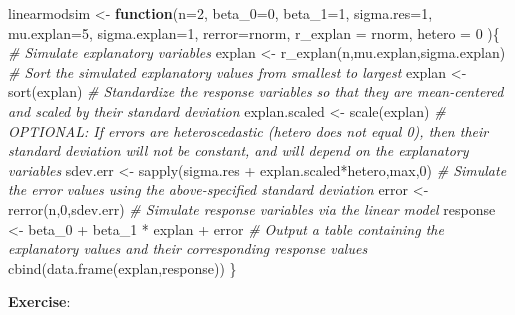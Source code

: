 \documentclass[
]{book}
\newenvironment{Shaded}{\begin{snugshade}}{\end{snugshade}}
\newcommand{\AttributeTok}[1]{\textcolor[rgb]{0.77,0.63,0.00}{#1}}
\newcommand{\CommentTok}[1]{\textcolor[rgb]{0.56,0.35,0.01}{\textit{#1}}}
\newcommand{\ControlFlowTok}[1]{\textcolor[rgb]{0.13,0.29,0.53}{\textbf{#1}}}
\newcommand{\DecValTok}[1]{\textcolor[rgb]{0.00,0.00,0.81}{#1}}
\newcommand{\FunctionTok}[1]{\textcolor[rgb]{0.00,0.00,0.00}{#1}}
\newcommand{\NormalTok}[1]{#1}
\newcommand{\OtherTok}[1]{\textcolor[rgb]{0.56,0.35,0.01}{#1}}
\newcommand{\SpecialCharTok}[1]{\textcolor[rgb]{0.00,0.00,0.00}{#1}}
\begin{document}
\begin{Shaded}
\begin{Highlighting}[]
\NormalTok{linearmodsim }\OtherTok{\textless{}{-}} \ControlFlowTok{function}\NormalTok{(}\AttributeTok{n=}\DecValTok{2}\NormalTok{, }\AttributeTok{beta\_0=}\DecValTok{0}\NormalTok{, }\AttributeTok{beta\_1=}\DecValTok{1}\NormalTok{, }\AttributeTok{sigma.res=}\DecValTok{1}\NormalTok{, }\AttributeTok{mu.explan=}\DecValTok{5}\NormalTok{, }\AttributeTok{sigma.explan=}\DecValTok{1}\NormalTok{, }\AttributeTok{rerror=}\NormalTok{rnorm, }\AttributeTok{r\_explan =}\NormalTok{ rnorm, }\AttributeTok{hetero =} \DecValTok{0}\NormalTok{ )\{}
  \CommentTok{\# Simulate explanatory variables}
\NormalTok{  explan }\OtherTok{\textless{}{-}} \FunctionTok{r\_explan}\NormalTok{(n,mu.explan,sigma.explan)}
  \CommentTok{\# Sort the simulated explanatory values from smallest to largest}
\NormalTok{  explan }\OtherTok{\textless{}{-}} \FunctionTok{sort}\NormalTok{(explan)}
  \CommentTok{\# Standardize the response variables so that they are  mean{-}centered and scaled by their standard deviation}
\NormalTok{  explan.scaled }\OtherTok{\textless{}{-}} \FunctionTok{scale}\NormalTok{(explan)}
  \CommentTok{\# OPTIONAL: If errors are heteroscedastic (hetero does not equal 0), then their standard deviation will not be constant, and will depend on the explanatory variables }
\NormalTok{  sdev.err }\OtherTok{\textless{}{-}} \FunctionTok{sapply}\NormalTok{(sigma.res }\SpecialCharTok{+}\NormalTok{ explan.scaled}\SpecialCharTok{*}\NormalTok{hetero,max,}\DecValTok{0}\NormalTok{)}
  \CommentTok{\# Simulate the error values using the above{-}specified standard deviation}
\NormalTok{  error }\OtherTok{\textless{}{-}} \FunctionTok{rerror}\NormalTok{(n,}\DecValTok{0}\NormalTok{,sdev.err)}
  \CommentTok{\# Simulate response variables via the linear model}
\NormalTok{  response }\OtherTok{\textless{}{-}}\NormalTok{ beta\_0 }\SpecialCharTok{+}\NormalTok{ beta\_1 }\SpecialCharTok{*}\NormalTok{ explan }\SpecialCharTok{+}\NormalTok{ error}
  \CommentTok{\# Output a table containing the explanatory values and their corresponding response values}
  \FunctionTok{cbind}\NormalTok{(}\FunctionTok{data.frame}\NormalTok{(explan,response))}
\NormalTok{\}}
\end{Highlighting}
\end{Shaded}

\textbf{Exercise}:
\end{document}
